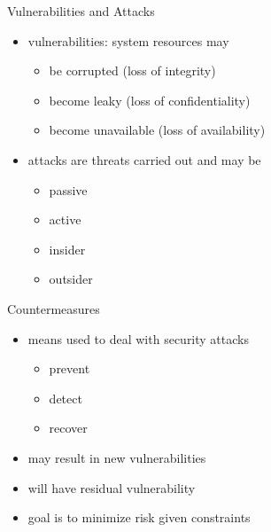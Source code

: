 \documentclass{beamer}
\begin{document}
\begin{frame}{Vulnerabilities and Attacks }
  \begin{itemize}
    \item vulnerabilities: system resources  may 
      
      \begin{itemize}
        \item be corrupted (loss of integrity) 
        \item become leaky (loss of confidentiality) 
        \item become unavailable (loss of availability) 
      \end{itemize}
    \item attacks are threats carried out and may be 
      \begin{itemize}
        \item passive
        \item active
        \item insider
        \item outsider
      \end{itemize}
  \end{itemize}
\end{frame}

\begin{frame}{Countermeasures}
  
  \begin{itemize}
    \item means used to deal with security attacks 
      
      \begin{itemize}
        \item prevent 
        \item detect 
        \item recover 
      \end{itemize}
    \item may result in new vulnerabilities 
    \item will have residual vulnerability 
    \item goal is to minimize risk given constraints
  \end{itemize}
\end{frame}
\end{document}
